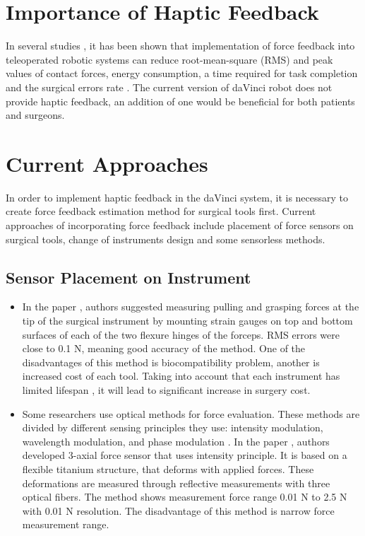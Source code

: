 

\section{Importance of Haptic Feedback}
\label{sec:hapticFeedbackImportance}

In several studies \cite{lim_role_2015, alleblas_effects_2017, currie_role_2017}, it has been shown that implementation of force feedback into teleoperated robotic systems can reduce root-mean-square (RMS) and peak values of contact forces, energy consumption, a time required for task completion and the surgical errors rate \cite{tavakoli_haptics_2008}. The current version of daVinci robot does not provide haptic feedback, an addition of one would be beneficial for both patients and surgeons.

\section{Current Approaches}
\label{sec:CurAppr}

In order to implement haptic feedback in the daVinci system, it is necessary to create force feedback estimation method for surgical tools first. Current approaches of incorporating force feedback include placement of force sensors on surgical tools, change of instruments design and some sensorless methods.

\subsection{Sensor Placement on Instrument}
\begin{itemize}
\item In the paper \cite{hong_design_2012}, authors suggested measuring pulling and grasping forces at the tip of the surgical instrument by mounting strain gauges on top and bottom surfaces of each of the two flexure hinges of the forceps. RMS errors were close to 0.1 N, meaning good accuracy of the method. One of the disadvantages of this method is biocompatibility problem, another is increased cost of each tool. Taking into account that each instrument has limited lifespan  \cite{ho_health_2011}, it will lead to significant increase in surgery cost.

\item  Some researchers use optical methods for force evaluation. These methods are divided by different sensing principles they use: intensity modulation, wavelength modulation, and phase modulation \cite{su_fiber_optic_2017}. In the paper \cite{_micro_2004}, authors developed 3-axial force sensor that uses intensity principle. It is based on a flexible titanium structure, that deforms with applied forces. These deformations are measured through reflective measurements with three optical fibers. The method shows measurement force range 0.01 N to 2.5 N with 0.01 N resolution. The disadvantage of this method is narrow force measurement range.
\end{itemize}

